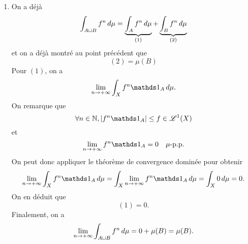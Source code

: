 {\begin{nntd-sol}[]
\begin{enumerate}
            \item On a déjà
            \begin{equation*}
                \int_{A\sqcup B}f^n\mathop{}\!{d}\mu = \underbrace{\int_{A}f^n\mathop{}\!{d}\mu}_{(1)} + \underbrace{\int_{B}f^n\mathop{}\!{d}\mu}_{(2)}
            \end{equation*}
            et on a déjà montré au point précédent que
            \begin{equation*}
                (2) = \mu(B)
            \end{equation*}
            Pour \((1)\), on a
            \begin{equation*}
                \lim_{n\to+\infty}\int_{X}f^n\one_A\der\mu.
            \end{equation*}
            On remarque que 
            \begin{equation*}
                \forall n\in\N, \n{f^n\one_A}\leq f\in\scr L^1(X)
            \end{equation*}
            et 
            \begin{equation*}
                \lim_{n\to+\infty}f^n\one_A = 0\quad \mu\text{-p.p.}
            \end{equation*}
            On peut donc appliquer le théorème de convergence dominée pour obtenir
            \begin{equation*}
                \lim_{n\to+\infty}\int_{X}f^n\one_A\der\mu = \int_{X}\lim_{n\to+\infty}f^n\one_A\der\mu = \int_{X}0\der\mu = 0.
            \end{equation*}
            On en déduit que
            \begin{equation*}
                (1) = 0.
            \end{equation*}
            Finalement, on a
            \begin{equation*}
                \lim_{n\to+\infty}\int_{A\sqcup B}f^n\mathop{}\!{d}\mu = 0 + \mu(B) = \mu(B).
            \end{equation*}
        \end{enumerate}
    \end{nntd-sol}
}{}


